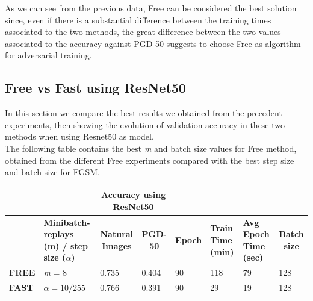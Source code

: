 \documentclass{article}
\begin{document}
As we can see from the previous data, Free can be considered the best solution since, even if there is a substantial difference between the training times associated to the two methods, the great difference between the two values associated to the accuracy against PGD-50 suggests to choose Free as algorithm for adversarial training.

\subsection{Free vs Fast using ResNet50}
In this section we compare the best results we obtained from the precedent
experiments, then showing the evolution of validation accuracy in these two
methods when using Resnet50 as model. \\
The following table contains the best \textit{m} and batch size values for Free method,
obtained from the different Free experiments compared with the best step size
and batch size for FGSM. 

\begin{table}[hbt!]
\begin{tabular}{|l|p{2.1cm}|c|l|l|l|l|l|}
\hline
              & \multicolumn{1}{l|}{}         &
              \multicolumn{2}{c|}{\textbf{Accuracy using ResNet50}}
              & \multicolumn{3}{l|}{\textbf{}}
              & \textbf{}                                \\ \hline
 & \textbf{Minibatch-replays (m) / step size ($\alpha$)} & \textbf{Natural
 Images}                      & \multicolumn{1}{c|}{\textbf{PGD-50}} &
 \multicolumn{1}{c|}{\textbf{Epoch}} & \multicolumn{1}{p{1cm}|}{\textbf{Train
 Time (min)}} & \multicolumn{1}{p{1cm}|}{\textbf{Avg Epoch Time (sec)}} &
 \multicolumn{1}{c|}{\textbf{Batch size}} \\ \hline
\textbf{FREE} & \textit{m} = 8 & \multicolumn{1}{l|}{0.735} & { 0.404}         & { 90}
& { 118}                     & { 79}                         & { 128}
\\ \hline
\textbf{FAST} & $\alpha = 10/255$       & \multicolumn{1}{l|}{0.766} & { 0.391}
& { 90}           & { 29}                     & { 19}                         &
{ 128}               \\ \hline
\end{tabular}
\end{table}
\end{document}

